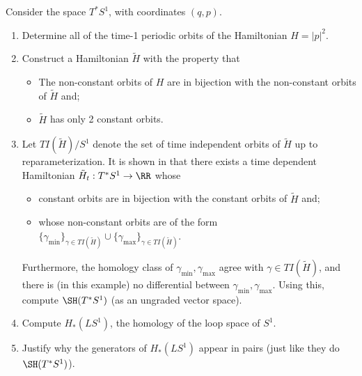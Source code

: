 
 
 
Consider the space $T^*S^1$, with coordinates $(q, p)$. 
\begin{enumerate}
    \item Determine all of the time-1 periodic orbits of the Hamiltonian $H=|p|^2$. 
    \item Construct a Hamiltonian $\tilde H$ with the property that 
    \begin{itemize}
        \item The non-constant orbits of $H$ are in bijection with the non-constant orbits of $\tilde H$ and;
        \item $\tilde H$ has only 2 constant orbits.
    \end{itemize}
    \item Let $TI(\tilde H)/S^1$ denote the set of time independent orbits of $\tilde H$ up to reparameterization. It is shown in \cite{bourgeois2009symplectic} that there exists a time dependent Hamiltonian $\tilde H_t: T^*S^1\to \RR$ whose
    \begin{itemize}
        \item constant orbits are in bijection with the constant orbits of $\tilde H$ and;
        \item whose non-constant orbits are of the form  $\{\gamma_{\min}\}_{\gamma\in TI(\tilde H)}\cup \{\gamma_{\max}\}_{\gamma\in TI(\tilde H)}$. 
    \end{itemize}
    Furthermore, the homology class of $\gamma_{\min}, \gamma_{\max}$ 
    agree with $\gamma\in TI(\tilde H)$, and there is (in this example) no differential between $\gamma_{\min}, \gamma_{\max}$.
    Using this, compute $\SH(T^*S^1)$ (as an ungraded vector space). 
    \item Compute $H_*(LS^1)$, the homology of the loop space of $S^1$.
    \item Justify why the generators of $H_*(LS^1)$ appear in pairs (just like they do $\SH(T^*S^1)$). 
\end{enumerate}

 